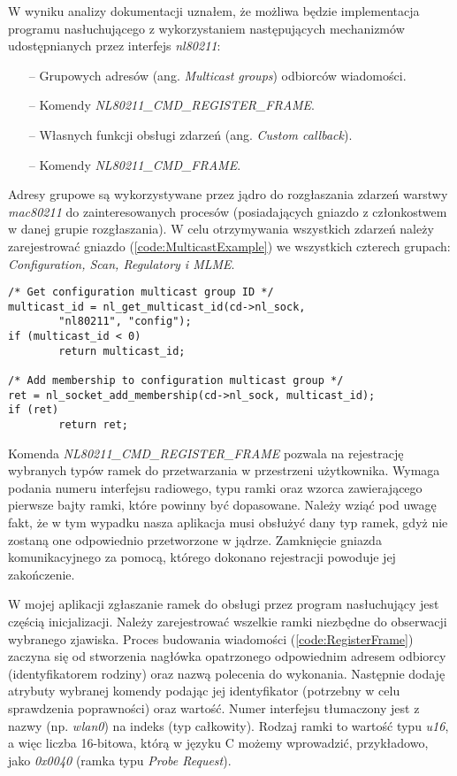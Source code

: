 W wyniku analizy dokumentacji uznałem, że możliwa będzie implementacja programu nasłuchującego z wykorzystaniem następujących mechanizmów udostępnianych przez interfejs \emph{nl80211}:

\begin{itemize}
\item[--] Grupowych adresów (ang. \emph{Multicast groups}) odbiorców wiadomości.
\item[--] Komendy \emph{NL80211\_CMD\_REGISTER\_FRAME}.
\item[--] Własnych funkcji obsługi zdarzeń (ang. \emph{Custom callback}).
\item[--] Komendy \emph{NL80211\_CMD\_FRAME}.
\end{itemize}

Adresy grupowe są wykorzystywane przez jądro do rozgłaszania zdarzeń warstwy \emph{mac80211} do zainteresowanych procesów (posiadających gniazdo z członkostwem w danej grupie rozgłaszania). W celu otrzymywania wszystkich zdarzeń należy zarejestrować gniazdo (\ref{code:MulticastExample}) we wszystkich czterech grupach: \emph{Configuration, Scan, Regulatory i MLME}. 

\begin{lstlisting}[frame=tb]
/* Get configuration multicast group ID */
multicast_id = nl_get_multicast_id(cd->nl_sock, 
        "nl80211", "config");
if (multicast_id < 0)
        return multicast_id;
                                        
/* Add membership to configuration multicast group */
ret = nl_socket_add_membership(cd->nl_sock, multicast_id);
if (ret)
        return ret;
\end{lstlisting}

Komenda \emph{NL80211\_CMD\_REGISTER\_FRAME} pozwala na rejestrację wybranych typów ramek do przetwarzania w przestrzeni użytkownika. Wymaga podania numeru interfejsu radiowego, typu ramki oraz wzorca zawierającego pierwsze bajty ramki, które powinny być dopasowane. Należy wziąć pod uwagę fakt, że w tym wypadku nasza aplikacja musi obsłużyć dany typ ramek, gdyż nie zostaną one odpowiednio przetworzone w jądrze. Zamknięcie gniazda komunikacyjnego za pomocą, którego dokonano rejestracji powoduje jej zakończenie. 

W mojej aplikacji zgłaszanie ramek do obsługi przez program nasłuchujący jest częścią inicjalizacji. Należy zarejestrować wszelkie ramki niezbędne do obserwacji wybranego zjawiska. Proces budowania wiadomości (\ref{code:RegisterFrame}) zaczyna się od stworzenia nagłówka opatrzonego odpowiednim adresem odbiorcy (identyfikatorem rodziny) oraz nazwą polecenia do wykonania. Następnie dodaję atrybuty wybranej komendy podając jej identyfikator (potrzebny w celu sprawdzenia poprawności) oraz wartość. Numer interfejsu tłumaczony jest z nazwy (np. \emph{wlan0}) na indeks (typ całkowity). Rodzaj ramki to wartość typu \emph{u16}, a więc liczba 16-bitowa, którą w języku C możemy wprowadzić, przykładowo, jako \emph{0x0040} (ramka typu \emph{Probe Request}). 

